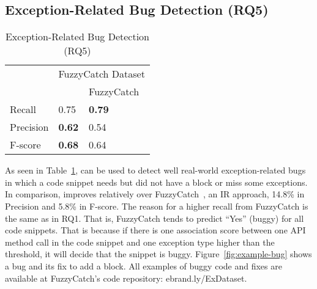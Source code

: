 \subsection{Exception-Related Bug Detection (RQ5)}
\label{sec:rq1}

\begin{table}[t]%
  \caption {Exception-Related Bug Detection (RQ5)}
  \vspace{-12pt}
  \small
	\begin{center}
		\renewcommand{\arraystretch}{1}
		\begin{tabular}{|p{1.75cm}<{\centering}|p{1.75cm}<{\centering}|p{1.75cm}<{\centering}|}
		  \hline
			\multirow{2}{*}{} & \multicolumn{2}{c|}{FuzzyCatch Dataset} \\
			\cline{2-3}
			  & \tool  & FuzzyCatch~\cite{xrank-fse20} \\
			\hline
			Recall    & 0.75 & \textbf{0.79}\\
			Precision & \textbf{0.62} & 0.54\\
			F-score   & \textbf{0.68} & 0.64\\
			\hline
		\end{tabular}
		\label{tab:bug}
	\end{center}
\end{table}



As seen in Table~\ref{tab:bug}, {\tool} can be used to detect well
real-world exception-related bugs in which a code snippet needs but
did not have a  block or miss some exceptions. In
comparison, {\tool} improves relatively over
FuzzyCatch~\cite{xrank-fse20}, an IR approach, 14.8\% in Precision and
5.8\% in F-score. The reason for a higher recall from FuzzyCatch is
the same as in RQ1. That is, FuzzyCatch tends to predict ``Yes''
(buggy) for all code snippets. That is because if there is one
association score between one API method call in the code snippet and
one exception type higher than the threshold, it will decide that the
snippet is buggy. Figure~\ref{fig:example-bug} shows a bug and its fix
to add a  block. All examples of buggy code and fixes
are available at FuzzyCatch's code repository: ebrand.ly/ExDataset.





